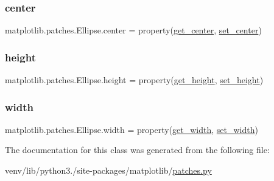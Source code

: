 \subsubsection{\texorpdfstring{center}{center}}
{\footnotesize\ttfamily matplotlib.\+patches.\+Ellipse.\+center = property(\hyperlink{classmatplotlib_1_1patches_1_1Ellipse_a0bced80a110919f884e374422801d013}{get\+\_\+center}, \hyperlink{classmatplotlib_1_1patches_1_1Ellipse_a7a9e42cd894c8f85917e940ea84fc1e3}{set\+\_\+center})\hspace{0.3cm}{\ttfamily [static]}}

\mbox{\label{classmatplotlib_1_1patches_1_1Ellipse_a0f3d6d29727e93758c785abd6b14abea}} 
\subsubsection{\texorpdfstring{height}{height}}
{\footnotesize\ttfamily matplotlib.\+patches.\+Ellipse.\+height = property(\hyperlink{classmatplotlib_1_1patches_1_1Ellipse_ac8e48dc5addbe0eeca0ee76f6d567397}{get\+\_\+height}, \hyperlink{classmatplotlib_1_1patches_1_1Ellipse_a1e9e57643cbc37eb5482b0872b743604}{set\+\_\+height})\hspace{0.3cm}{\ttfamily [static]}}

\mbox{\label{classmatplotlib_1_1patches_1_1Ellipse_a60c9f834917ca71a1ca9f92d6e5b7986}} 
\subsubsection{\texorpdfstring{width}{width}}
{\footnotesize\ttfamily matplotlib.\+patches.\+Ellipse.\+width = property(\hyperlink{classmatplotlib_1_1patches_1_1Ellipse_a6ce07595904968e01631afe4f8fa467b}{get\+\_\+width}, \hyperlink{classmatplotlib_1_1patches_1_1Ellipse_a550e52dde5db8ebd22b17735c96ae4cf}{set\+\_\+width})\hspace{0.3cm}{\ttfamily [static]}}



The documentation for this class was generated from the following file\+:\begin{DoxyCompactItemize}
\item 
venv/lib/python3./site-\/packages/matplotlib/\hyperlink{patches_8py}{patches.\+py}\end{DoxyCompactItemize}
